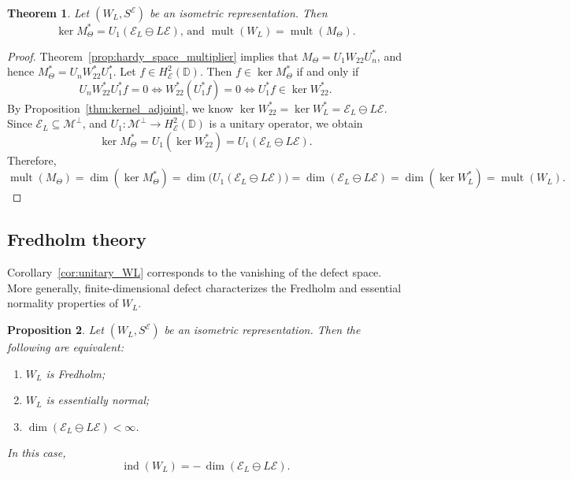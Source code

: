 \documentclass[12pt]{amsart}
\newtheorem{theorem}{Theorem}[section]
\newtheorem{proposition}[theorem]{Proposition}
\theoremstyle{definition}
\theoremstyle{remark}
\def \D{\mathbb{D}}
\newcommand{\cle}{\mathcal{E}}
\newcommand{\clm}{\mathcal{M}}
\newcommand{\ind}{\operatorname{ind}}
\numberwithin{equation}{section}
\begin{document}
\begin{theorem}\label{thm:wold_decomposition}
Let $(W_L, S^\cle)$ be an isometric representation. Then 
\[
\ker M_\Theta^*=U_1(\cle_L \ominus L\cle),\, \text{and }
\operatorname{mult}(W_L)=\operatorname{mult}(M_\Theta).
\]
\end{theorem}

\begin{proof}
Theorem~\ref{prop:hardy_space_multiplier} implies that $M_\Theta = U_1 W_{22} U_n^*$, and hence $M_\Theta^* = U_n W_{22}^* U_1^*$. Let $f \in H^2_\cle(\D)$. Then $f \in \ker M_\Theta^*$ if and only if
\[
U_n W_{22}^* U_1^* f = 0 \iff W_{22}^* (U_1^* f) = 0 \iff U_1^* f \in \ker W_{22}^*.
\]
By Proposition~\ref{thm:kernel_adjoint}, we know $\ker W_{22}^* = \ker W_L^* = \cle_L \ominus L\cle$. Since $\cle_L \subseteq \clm^\perp$, and $U_1 : \clm^\perp \to H^2_\cle(\D)$ is a unitary operator, we obtain
\[
\ker M_\Theta^* = U_1(\ker W_{22}^*) = U_1(\cle_L \ominus L\cle).
\]
Therefore,
\[
\operatorname{mult}(M_\Theta) = \dim(\ker M_\Theta^*) = \dim \big(U_1(\cle_L \ominus L\cle)\big) = \dim(\cle_L \ominus L\cle) = \dim(\ker W_L^*) = \operatorname{mult}(W_L).
\]
\end{proof}




\subsection{Fredholm theory }\label{sec:FTCT}
Corollary~\ref{cor:unitary_WL} corresponds to the vanishing of the defect space. More generally, finite-dimensional defect characterizes the Fredholm and essential normality properties of $W_L$.


\begin{proposition}\label{prop:fredholm_essentially_normal}
Let $(W_L, S^\cle)$ be an isometric representation. Then the following are equivalent:
\begin{enumerate}
    \item $W_L$ is Fredholm;
    \item $W_L$ is essentially normal;
    \item $\dim(\cle_L\ominus L\cle)<\infty$.
\end{enumerate}
In this case,
\[
\ind(W_L)=-\,\dim(\cle_L\ominus L\cle).
\]
\end{proposition}
\end{document}
